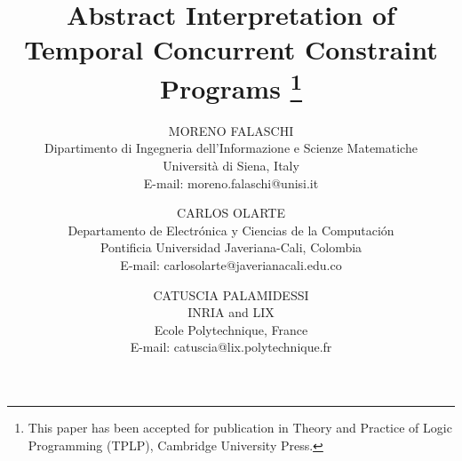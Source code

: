 \documentclass{tlp}
\begin{document}
\long{}




\title[Abstract Interpretation of Temporal CCP]{Abstract Interpretation of Temporal Concurrent Constraint Programs \footnote{This paper has been accepted for publication in Theory and Practice of Logic Programming (TPLP), Cambridge University Press. }} 

\author[M. Falaschi, C. Olarte and C. Palamidessi]{MORENO FALASCHI\\
Dipartimento di Ingegneria dell'Informazione e Scienze Matematiche\\
 Universit\`a di Siena, Italy \\
E-mail: moreno.falaschi@unisi.it
\and 
CARLOS OLARTE \\
Departamento de Electr\'onica y Ciencias de la Computaci\'on\\
Pontificia Universidad Javeriana-Cali, Colombia\\
E-mail: carlosolarte@javerianacali.edu.co
\and
CATUSCIA PALAMIDESSI\\
INRIA and LIX\\
 Ecole Polytechnique, France\\
E-mail: catuscia@lix.polytechnique.fr
}




\maketitle
\end{document}
